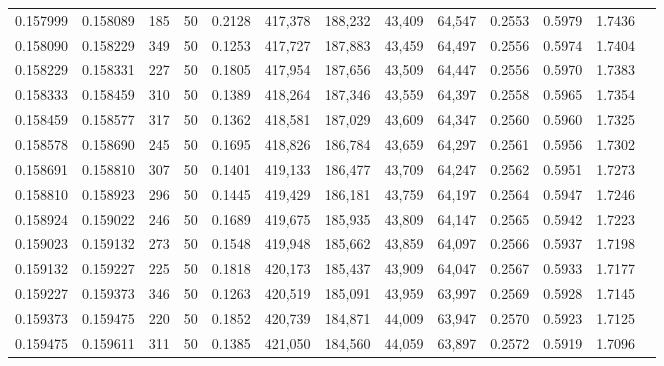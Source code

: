 \begin{tabular}{rrrrrrrrrrrrr}
0.157999 & 0.158089 &   185 &  50 &                                     0.2128 & 417,378 & 188,232 &  43,409 &  64,547 & 0.2553 & 0.5979 & 1.7436 \\
0.158090 & 0.158229 &   349 &  50 &                                     0.1253 & 417,727 & 187,883 &  43,459 &  64,497 & 0.2556 & 0.5974 & 1.7404 \\
0.158229 & 0.158331 &   227 &  50 &                                     0.1805 & 417,954 & 187,656 &  43,509 &  64,447 & 0.2556 & 0.5970 & 1.7383 \\
0.158333 & 0.158459 &   310 &  50 &                                     0.1389 & 418,264 & 187,346 &  43,559 &  64,397 & 0.2558 & 0.5965 & 1.7354 \\
0.158459 & 0.158577 &   317 &  50 &                                     0.1362 & 418,581 & 187,029 &  43,609 &  64,347 & 0.2560 & 0.5960 & 1.7325 \\
0.158578 & 0.158690 &   245 &  50 &                                     0.1695 & 418,826 & 186,784 &  43,659 &  64,297 & 0.2561 & 0.5956 & 1.7302 \\
0.158691 & 0.158810 &   307 &  50 &                                     0.1401 & 419,133 & 186,477 &  43,709 &  64,247 & 0.2562 & 0.5951 & 1.7273 \\
0.158810 & 0.158923 &   296 &  50 &                                     0.1445 & 419,429 & 186,181 &  43,759 &  64,197 & 0.2564 & 0.5947 & 1.7246 \\
0.158924 & 0.159022 &   246 &  50 &                                     0.1689 & 419,675 & 185,935 &  43,809 &  64,147 & 0.2565 & 0.5942 & 1.7223 \\
0.159023 & 0.159132 &   273 &  50 &                                     0.1548 & 419,948 & 185,662 &  43,859 &  64,097 & 0.2566 & 0.5937 & 1.7198 \\
0.159132 & 0.159227 &   225 &  50 &                                     0.1818 & 420,173 & 185,437 &  43,909 &  64,047 & 0.2567 & 0.5933 & 1.7177 \\
0.159227 & 0.159373 &   346 &  50 &                                     0.1263 & 420,519 & 185,091 &  43,959 &  63,997 & 0.2569 & 0.5928 & 1.7145 \\
0.159373 & 0.159475 &   220 &  50 &                                     0.1852 & 420,739 & 184,871 &  44,009 &  63,947 & 0.2570 & 0.5923 & 1.7125 \\
0.159475 & 0.159611 &   311 &  50 &                                     0.1385 & 421,050 & 184,560 &  44,059 &  63,897 & 0.2572 & 0.5919 & 1.7096 \\

\end{tabular}
